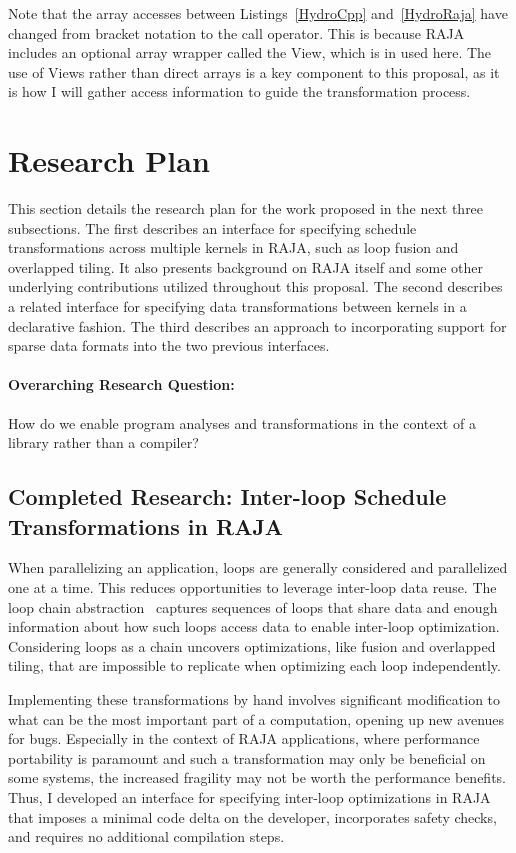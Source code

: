 \documentclass{article}
\begin{document}
Note that the array accesses between Listings~\ref{HydroCpp} and~\ref{HydroRaja} have changed from bracket notation to the call operator. 
This is because RAJA includes an optional array wrapper called the View, which is in used here.
The use of Views rather than direct arrays is a key component to this proposal, as it is how I will gather access information to guide the transformation process.



\section{Research Plan}
This section details the research plan for the work proposed in the next three subsections. 
The first describes an interface for specifying schedule transformations across multiple kernels in RAJA, such as loop fusion and overlapped tiling. 
It also presents background on RAJA itself and some other underlying contributions utilized throughout this proposal.
The second describes a related interface for specifying data transformations between kernels in a declarative fashion. 
The third describes an approach to incorporating support for sparse data formats into the two previous interfaces. 

\paragraph{Overarching Research Question:} How do we enable program analyses and transformations in the context of a library rather than a compiler?

\subsection{Completed Research: Inter-loop Schedule Transformations in RAJA}
\label{Sec:Work1}
When parallelizing an application, loops are generally considered and
parallelized one at a time.
This reduces opportunities to leverage inter-loop data reuse.
The loop chain abstraction~\cite{krieger2013loop} captures sequences of loops that share 
data and enough information about how such loops access 
data to enable inter-loop optimization.
Considering loops as a chain uncovers optimizations, like fusion
and overlapped tiling, that are impossible to replicate when optimizing
each loop independently.

Implementing these transformations by hand involves significant modification to what can be the most important part of a computation, opening up new avenues for bugs. 
Especially in the context of RAJA applications, where performance portability is paramount and such a transformation may only be beneficial on some systems, the increased fragility may not be worth the performance benefits. 
Thus, I developed an interface for specifying inter-loop optimizations in RAJA that imposes a minimal code delta on the developer, incorporates safety checks, and requires no additional compilation steps. 
\end{document}
